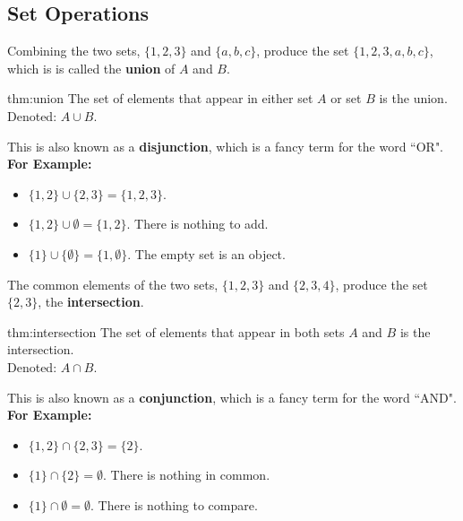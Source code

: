 \subsection{Set Operations}


Combining the two sets, $\{1,2,3\}$ and $\{a,b,c\}$, produce the set $\{1,2,3,a,b,c\}$, which is
is called the \textbf{union} of $A$ and $B$.\\

\begin{theo}[Union]{thm:union}
    The set of elements that appear in either set $A$ or set $B$ is the union.\\
    Denoted: $A \cup B$.
\end{theo}

\noindent
This is also known as a \textbf{disjunction}, which is a fancy term for the word ``OR".\\

\noindent
\textbf{For Example:}
\begin{itemize}
    \item $\{1, 2\} \cup \{2, 3\} = \{1, 2, 3\}$.
    \item $\{1,2\} \cup \emptyset = \{1, 2\}$. There is nothing to add.
    \item $\{1\} \cup \{\emptyset\} = \{1, \emptyset\}$. The empty set is an object.
\end{itemize}

\newpage
\noindent
The common elements of the two sets, $\{1,2,3\}$ and $\{2,3,4\}$, produce the set $\{2,3\}$,
the \textbf{intersection}.\\

\begin{theo}[Intersection]{thm:intersection}
    The set of elements that appear in both sets $A$ and $B$ is the intersection.\\
    Denoted: $A \cap B$.
\end{theo}

\noindent
This is also known as a \textbf{conjunction}, which is a fancy term for the word ``AND".\\

\noindent
\textbf{For Example:}
\begin{itemize}
    \item $\{1, 2\} \cap \{2, 3\} = \{2\}$.
    \item $\{1\} \cap \{2\} = \emptyset$. There is nothing in common.
    \item $\{1\} \cap \emptyset = \emptyset$. There is nothing to compare.
\end{itemize}

